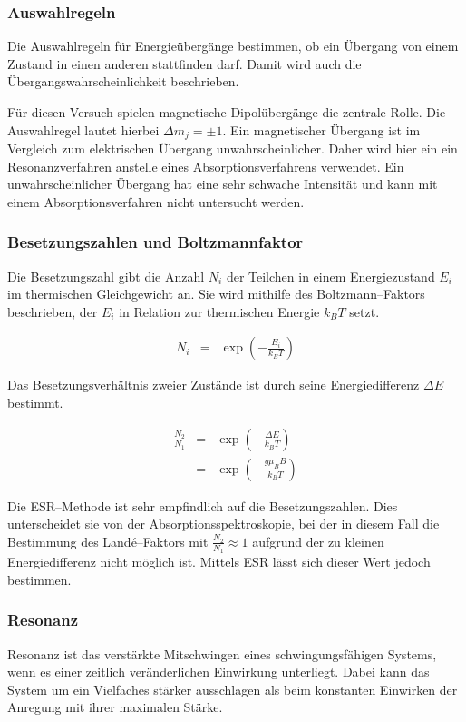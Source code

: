 \documentclass[12pt,a4paper]{scrartcl}
\numberwithin{equation}{section} %
\begin{document}
\subsubsection{Auswahlregeln}
Die Auswahlregeln für Energieübergänge bestimmen, ob ein Übergang von einem Zustand in einen anderen stattfinden darf. Damit wird auch die Übergangswahrscheinlichkeit beschrieben.

Für diesen Versuch spielen magnetische Dipolübergänge die zentrale Rolle. Die Auswahlregel lautet hierbei $\Delta m_j = \pm 1$. Ein magnetischer Übergang ist im Vergleich zum elektrischen Übergang unwahrscheinlicher. Daher wird hier ein ein Resonanzverfahren anstelle eines Absorptionsverfahrens verwendet. Ein unwahrscheinlicher Übergang hat eine sehr schwache Intensität und kann mit einem Absorptionsverfahren nicht untersucht werden.

\subsubsection{Besetzungszahlen und Boltzmannfaktor}
Die Besetzungszahl gibt die Anzahl $N_i$ der Teilchen in einem Energiezustand $E_i$ im thermischen Gleichgewicht an. Sie wird mithilfe des Boltzmann--Faktors beschrieben, der $E_i$ in Relation zur thermischen Energie $k_BT$ setzt.

\begin{eqnarray}
	N_i &=& \exp(-\frac{E_i}{k_BT})
\end{eqnarray}

\noindent
Das Besetzungsverhältnis zweier Zustände ist durch seine Energiedifferenz $\Delta E$ bestimmt.

\begin{eqnarray}
	\frac{N_2}{N_1} &=& \exp(-\frac{\Delta E}{k_BT}) \\
		&=& \exp(-\frac{g\mu _B B}{k_BT})
\end{eqnarray}

\noindent
Die ESR--Methode ist sehr empfindlich auf die Besetzungszahlen. Dies unterscheidet sie von der Absorptionsspektroskopie, bei der in diesem Fall die Bestimmung des Landé--Faktors mit \(\frac{N_2}{N_1} \approx 1\) aufgrund der zu kleinen Energiedifferenz nicht möglich ist. Mittels ESR lässt sich dieser Wert jedoch bestimmen.

\hypertarget{resonanz}{\subsubsection{Resonanz}\label{resonanz}}
Resonanz ist das verstärkte Mitschwingen eines schwingungsfähigen Systems, wenn es einer zeitlich veränderlichen Einwirkung unterliegt. Dabei kann das System um ein Vielfaches stärker ausschlagen als beim konstanten Einwirken der Anregung mit ihrer maximalen Stärke.
\end{document}
